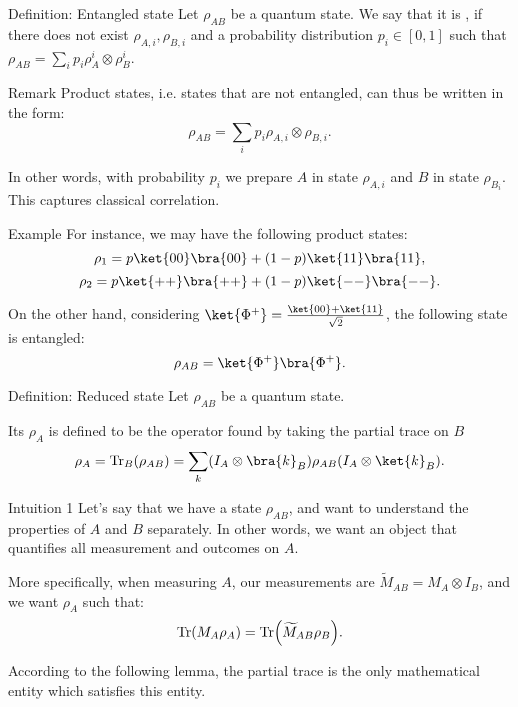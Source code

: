 \documentclass[a4paper]{article}
\begin{document}
\begin{parag}{Definition: Entangled state}
    Let $\rho_{AB}$ be a quantum state. We say that it is , if there does not exist $\rho_{A,i}, \rho_{B,i}$ and a probability distribution $p_i \in \left[0,1\right]$ such that $\rho_{AB} = \sum_{i} p_i \rho_A^i \otimes \rho_B^i$.

    \begin{subparag}{Remark}
        Product states, i.e. states that are not entangled, can thus be written in the form:
        \[\rho_{AB} = \sum_{i} p_i \rho_{A,i} \otimes \rho_{B,i}.\]

        In other words, with probability $p_i$ we prepare $A$ in state $\rho_{A,i}$ and $B$ in state $\rho_{B_i}$. This captures classical correlation.
    \end{subparag}
    
    \begin{subparag}{Example}
        For instance, we may have the following product states: 
        \[\rho_1 = p \ket{00} \bra{00} + \left(1-p\right) \ket{11}\bra{11},\]
        \[\rho_2 = p \ket{++}\bra{++} + \left(1-p\right) \ket{--}\bra{--}.\]

        On the other hand, considering $\ket{\Phi^+} = \frac{\ket{00} + \ket{11}}{\sqrt{2}}$, the following state is entangled: 
        \[\rho_{AB} = \ket{\Phi^+} \bra{\Phi^+}.\]
    \end{subparag}
\end{parag}

\begin{parag}{Definition: Reduced state}
    Let $\rho_{AB}$ be a quantum state. 

    Its  $\rho_A$ is defined to be the operator found by taking the partial trace on $B$
    \[\rho_A = \Tr_B\left(\rho_{AB}\right) = \sum_{k} \left(I_A \otimes \bra{k}_B\right) \rho_{AB} \left(I_A \otimes \ket{k}_B\right).\]

    \begin{subparag}{Intuition 1}
        Let's say that we have a state $\rho_{AB}$, and want to understand the properties of $A$ and $B$ separately. In other words, we want an object that quantifies all measurement and outcomes on $A$.

        More specifically, when measuring $A$, our measurements are $\widetilde{M}_{AB} = M_A \otimes I_B$, and we want $\rho_A$ such that: 
        \[\Tr\left(M_A \rho_A\right) = \Tr\left(\widetilde{M}_{AB} \rho_B\right).\]

        According to the following lemma, the partial trace is the only mathematical entity which satisfies this entity.
    \end{subparag}
\end{parag}
\end{document}

